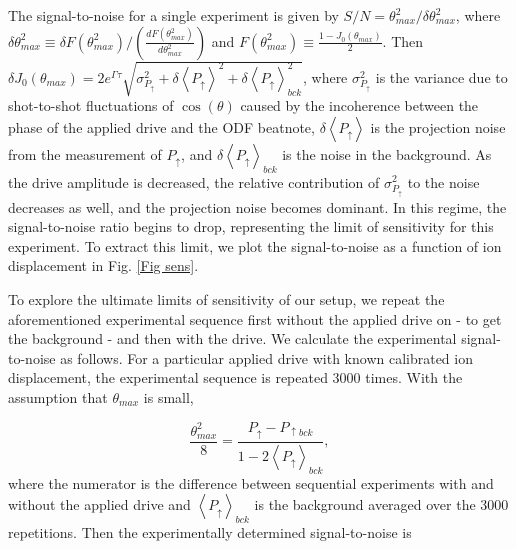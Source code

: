 \documentclass[aps,prl,twocolumn,superscriptaddress,floatfix]{revtex4-1}
\begin{document}
The signal-to-noise for a single experiment is given by $S/N =\theta_{max}^{2}/\delta \theta_{max}^{2}$, where $\delta \theta_{max}^{2} \equiv \delta F(\theta_{max}^{2})/ \left( \frac{dF(\theta_{max}^{2})}{d\theta_{max}^{2}} \right)$ and  $F(\theta_{max}^{2}) \equiv \frac{1-J_0(\theta_{max})}{2}$. Then $\delta J_0(\theta_{max}) = 2e^{\Gamma \tau} \sqrt{\sigma^{2}_{P_{\uparrow}} + \delta \left< P_{\uparrow} \right>^{2} + \delta\left< P_{\uparrow} \right>^{2}_{bck}}$, where $\sigma^{2}_{P_{\uparrow}}$ is the variance due to shot-to-shot fluctuations of $\cos(\theta)$ caused by the incoherence between the phase of the applied drive and the ODF beatnote, $\delta \left< P_{\uparrow} \right>$ is the projection noise from the measurement of $P_{\uparrow}$, and $\delta \left< P_{\uparrow} \right>_{bck}$ is the noise in the background. As the drive amplitude is decreased, the relative contribution of $\sigma^{2}_{P_{\uparrow}}$ to the noise decreases as well, and the projection noise becomes dominant. In this regime, the signal-to-noise ratio begins to drop, representing the limit of sensitivity for this experiment. To extract this limit, we plot the signal-to-noise as a function of ion displacement in Fig. \ref{Fig sens}. 

To explore the ultimate limits of sensitivity of our setup, we repeat the aforementioned experimental sequence first without the applied drive on - to get the background - and then with the drive. We calculate the experimental signal-to-noise as follows. For a particular applied drive with known calibrated ion displacement, the experimental sequence is repeated 3000 times. With the assumption that $\theta_{max}$ is small, 

\begin{equation}
\frac{\theta^{2}_{max}}{8} = \frac{P_{\uparrow} - P_{\uparrow bck}}{1-2\left< P_{\uparrow} \right>_{bck}},
\end{equation}
where the numerator is the difference between sequential experiments with and without the applied drive and $\left< P_{\uparrow} \right>_{bck}$ is the background averaged over the 3000 repetitions. Then the experimentally determined signal-to-noise is
\end{document}
